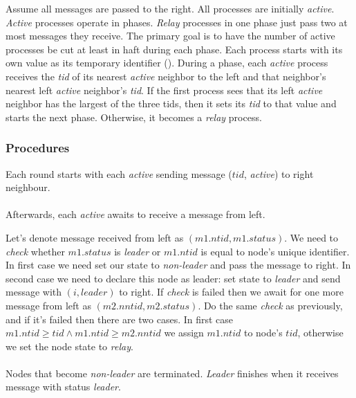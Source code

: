 \documentclass{article}
\begin{document}
Assume all messages are passed to the right. All processes are initially \textit{active}. \textit{Active} processes operate in phases. \textit{Relay} processes in one phase just pass two at most messages they receive. The primary goal is to have the number of active processes be cut at least in haft during each phase. Each process starts with its own value as its temporary identifier (). During a phase, each \textit{active} process receives the \textit{tid} of its nearest \textit{active} neighbor to the left and that neighbor's nearest left \textit{active} neighbor's \textit{tid}. If the first process sees that its left \textit{active} neighbor has the largest of the three tids, then it sets its \textit{tid} to that value and starts the next phase. Otherwise, it becomes a \textit{relay} process.

\subsubsection*{Procedures}

Each round starts with each \textit{active} sending message ($tid$, \textit{active}) to right neighbour.
\paragraph{}
Afterwards, each \textit{active} awaits to receive a message from left.

Let's denote message received from left as $(m1.ntid, m1.status)$. We need to \textit{check} whether $m1.status$ is \textit{leader} or $m1.ntid$ is equal to node's unique identifier. In first case we need set our state to \textit{non-leader} and pass the message to right. In second case we need to declare this node as leader: set state to \textit{leader} and send message with $(i, \textit{leader})$ to right. If \textit{check} is failed then we await for one more message from left as $(m2.nntid, m2.status)$. Do the same \textit{check} as previously, and if it's failed then there are two cases. In first case $m1.ntid \geq tid \land m1.ntid \geq m2.nntid$ we assign $m1.ntid$ to node's $tid$, otherwise we set the node state to \textit{relay}.

\paragraph{}
Nodes that become \textit{non-leader} are terminated. \textit{Leader} finishes when it receives message with status \textit{leader}.
\end{document}

